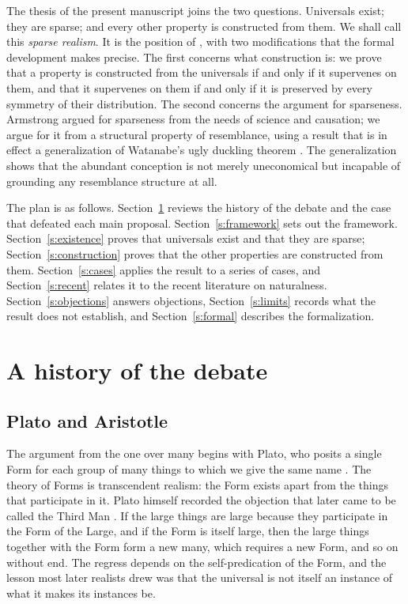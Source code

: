 \documentclass{situationist-preprint}
\begin{document}
The thesis of the present manuscript joins the two questions. Universals exist; they are sparse; and every other property is constructed from them. We shall call this \emph{sparse realism}. It is the position of \citet{Armstrong1978}, with two modifications that the formal development makes precise. The first concerns what construction is: we prove that a property is constructed from the universals if and only if it supervenes on them, and that it supervenes on them if and only if it is preserved by every symmetry of their distribution. The second concerns the argument for sparseness. Armstrong argued for sparseness from the needs of science and causation; we argue for it from a structural property of resemblance, using a result that is in effect a generalization of Watanabe's ugly duckling theorem \citep{Watanabe1969}. The generalization shows that the abundant conception is not merely uneconomical but incapable of grounding any resemblance structure at all.

The plan is as follows. Section~\ref{s:history} reviews the history of the debate and the case that defeated each main proposal. Section~\ref{s:framework} sets out the framework. Section~\ref{s:existence} proves that universals exist and that they are sparse; Section~\ref{s:construction} proves that the other properties are constructed from them. Section~\ref{s:cases} applies the result to a series of cases, and Section~\ref{s:recent} relates it to the recent literature on naturalness. Section~\ref{s:objections} answers objections, Section~\ref{s:limits} records what the result does not establish, and Section~\ref{s:formal} describes the formalization.

\section{A history of the debate}\label{s:history}

\subsection{Plato and Aristotle}

The argument from the one over many begins with Plato, who posits a single Form for each group of many things to which we give the same name \citep[596a]{PlatoRepublic}. The theory of Forms is transcendent realism: the Form exists apart from the things that participate in it. Plato himself recorded the objection that later came to be called the Third Man \citep[132a--b]{PlatoParmenides}. If the large things are large because they participate in the Form of the Large, and if the Form is itself large, then the large things together with the Form form a new many, which requires a new Form, and so on without end. The regress depends on the self-predication of the Form, and the lesson most later realists drew was that the universal is not itself an instance of what it makes its instances be.
\end{document}
